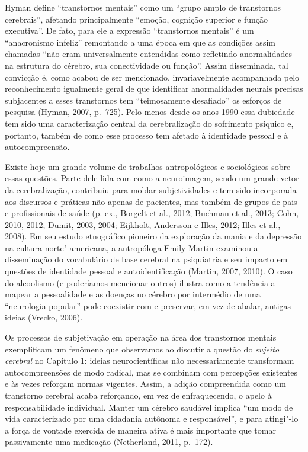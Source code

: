 Hyman define ``transtornos mentais'' como um ``grupo amplo de
transtornos cerebrais'', afetando principalmente ``emoção, cognição
superior e função executiva''. De fato, para ele a expressão
``transtornos mentais'' é um ``anacronismo infeliz'' remontando a uma
época em que as condições assim chamadas ``não eram universalmente
entendidas como refletindo anormalidades na estrutura do cérebro, sua
conectividade ou função''. Assim disseminada, tal convicção é, como
acabou de ser mencionado, invariavelmente acompanhada pelo
reconhecimento igualmente geral de que identificar anormalidades neurais
precisas subjacentes a esses transtornos tem ``teimosamente desafiado''
os esforços de pesquisa (Hyman, 2007, p.~725). Pelo menos desde os anos
1990 essa dubiedade tem sido uma caracterização central da
cerebralização do sofrimento psíquico e, portanto, também de como esse
processo tem afetado à identidade pessoal e à autocompreensão.

Existe hoje um grande volume de trabalhos antropológicos e sociológicos
sobre essas questões. Parte dele lida com como a neuroimagem, sendo um
grande vetor da cerebralização, contribuiu para moldar subjetividades e
tem sido incorporada aos discursos e práticas não apenas de pacientes,
mas também de grupos de pais e profissionais de saúde (p. ex., Borgelt et
al., 2012; Buchman et al., 2013; Cohn, 2010, 2012; Dumit, 2003, 2004;
Eijkholt, Andersson e Illes, 2012; Illes et al., 2008). Em seu estudo
etnográfico pioneiro da exploração da mania e da depressão na cultura
norte"-americana, a antropóloga Emily Martin examinou a disseminação do
vocabulário de base cerebral na psiquiatria e seu impacto em questões de
identidade pessoal e autoidentificação (Martin, 2007, 2010). O caso do
alcoolismo (e poderíamos mencionar outros) ilustra como a tendência a
mapear a pessoalidade e as doenças no cérebro por intermédio de uma
``neurologia popular'' pode coexistir com e preservar, em vez de abalar,
antigas ideias (Vrecko, 2006).

Os processos de subjetivação em operação na área dos transtornos mentais
exemplificam um fenômeno que observamos ao discutir a questão do
\emph{sujeito cerebral} no Capítulo 1: ideias neurocientíficas não
necessariamente transformam autocompreensões de modo radical, mas se
combinam com percepções existentes e às vezes reforçam normas vigentes.
Assim, a adição compreendida como um transtorno cerebral acaba
reforçando, em vez de enfraquecendo, o apelo à responsabilidade
individual. Manter um cérebro saudável implica ``um modo de vida
caracterizado por uma cidadania autônoma e responsável'', e para
atingi"-lo a força de vontade exercida de maneira ativa é mais importante
que tomar passivamente uma medicação (Netherland, 2011, p.~172).

